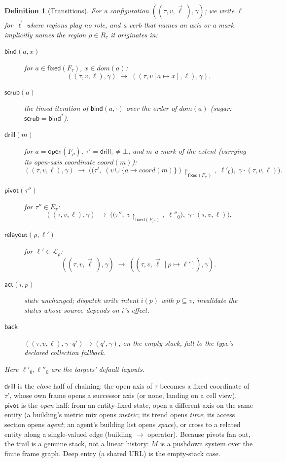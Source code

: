 \documentclass[11pt,a4paper]{article}
\newtheorem{definition}{Definition}[section]
\theoremstyle{remark}
\newcommand{\Dom}{\mathit{dom}}
\newcommand{\open}{\mathsf{open}}
\newcommand{\fixed}{\mathsf{fixed}}
\newcommand{\vbind}{\mathsf{bind}}
\newcommand{\vscrub}{\mathsf{scrub}}
\newcommand{\vdrill}{\mathsf{drill}}
\newcommand{\vpivot}{\mathsf{pivot}}
\newcommand{\vrelayout}{\mathsf{relayout}}
\newcommand{\vact}{\mathsf{act}}
\newcommand{\vback}{\mathsf{back}}
\newcommand{\LL}{\mathcal{L}}
\newcommand{\src}{\mathit{source}}
\newcommand{\coord}{\mathit{coord}}
\begin{document}
\begin{definition}[Transitions]\label{def:verbs}
For a configuration $((\tau, v, \vec{\ell}\,), \gamma)$; we write $\ell$ for
$\vec{\ell}$ where regions play no role, and a verb that names an axis or a mark
implicitly names the region $\rho \in R_\tau$ it originates in:
\begin{description}
\item[$\vbind(a, x)$] for $a \in \fixed(F_\tau)$, $x \in \Dom(a)$:
  \[ ((\tau, v, \ell), \gamma) \;\to\; ((\tau, v[a \mapsto x], \ell), \gamma). \]
\item[$\vscrub(a)$] the timed iteration of $\vbind(a, \cdot)$ over the order of
  $\Dom(a)$ (sugar: $\vscrub = \vbind^{*}$).
\item[$\vdrill(m)$] for $a = \open(F_\rho)$, $\tau' = \vdrill_\tau \neq \bot$, and
  $m$ a mark of the extent (carrying its open-axis coordinate $\coord(m)$):
  \[ ((\tau, v, \ell), \gamma) \;\to\;
     \bigl(\bigl(\tau',\; (v \cup \{a \mapsto \coord(m)\})\!\restriction_{\fixed(F_{\tau'})},\; \ell'_0\bigr),\;
     \gamma \cdot (\tau, v, \ell)\bigr). \]
\item[$\vpivot(\tau'')$] for $\tau'' \in E_\tau$:
  \[ ((\tau, v, \ell), \gamma) \;\to\;
     \bigl(\bigl(\tau'',\; v\!\restriction_{\fixed(F_{\tau''})},\; \ell''_0\bigr),\;
     \gamma \cdot (\tau, v, \ell)\bigr). \]
\item[$\vrelayout(\rho, \ell')$] for $\ell' \in \LL_\rho$:
  \[ ((\tau, v, \vec{\ell}\,), \gamma) \;\to\; ((\tau, v, \vec{\ell}\,[\rho \mapsto \ell']), \gamma). \]
\item[$\vact(i, p)$] state unchanged; dispatch write intent $i(p)$ with
  $p \subseteq v$; invalidate the states whose $\src$ depends on $i$'s effect.
\item[$\vback$]
  $((\tau, v, \ell), \gamma \cdot q') \to (q', \gamma)$; on the empty stack, fall to
  the type's declared collection fallback.
\end{description}
Here $\ell'_0, \ell''_0$ are the targets' default layouts.
\end{definition}

$\vdrill$ is the \emph{close} half of chaining: the open axis of $\tau$ becomes a
fixed coordinate of $\tau'$, whose own frame opens a successor axis (or none,
landing on a cell view). $\vpivot$ is the \emph{open} half: from an entity-fixed
state, open a different axis on the same entity (a building's metric mix opens
\emph{metric}; its trend opens \emph{time}; its access section opens \emph{agent};
an agent's building list opens \emph{space}), or cross to a related entity along a
single-valued edge (building $\to$ operator). Because pivots fan out, the trail is
a genuine stack, not a linear history: $M$ is a pushdown system over the finite
frame graph. Deep entry (a shared URL) is the empty-stack case.
\end{document}
